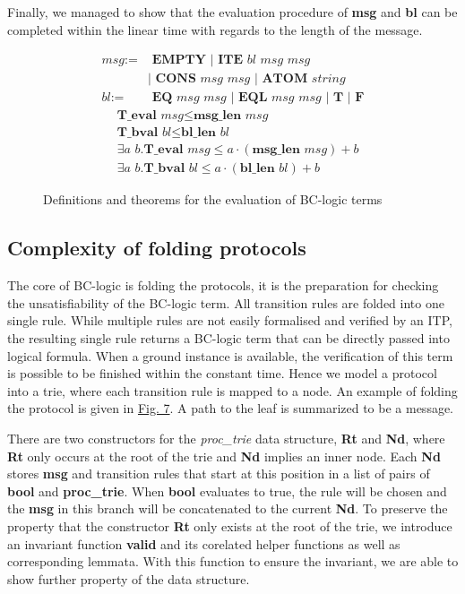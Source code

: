 \documentclass[conference]{IEEEtran}
\begin{document}
Finally, we managed to show that the evaluation procedure of \textbf{msg} and \textbf{bl} can be completed within the linear time with regards to the length of the message.
\begin{figure}
\centering
\begin{align}
    \textit{msg} :=& \textbf{ EMPTY } | \textbf{ ITE } \textit{bl msg msg } \nonumber \\ 
    &| \textbf{ CONS } \textit{msg msg } | \textbf{ ATOM } \textit{string} \nonumber\\
    \textit{bl} :=& \textbf{ EQ } \textit{msg msg } | \textbf{ EQL } \textit{msg msg } | \textbf{ T } | \textbf{ F} \nonumber
 \end{align}
 \begin{align}
    &\textbf{T\_eval } \textit{msg} \leq \textbf{msg\_len } \textit{msg} \nonumber\\
    &\textbf{T\_bval } \textit{bl} \leq \textbf{bl\_len } \textit{bl} \nonumber\\
    & \exists \textit{a b}. \textbf{T\_eval } \textit{msg} \leq a \cdot (\textbf{msg\_len} \textit{ msg}) + b\nonumber\\
    & \exists \textit{a b}. \textbf{T\_bval } \textit{bl} \leq a \cdot (\textbf{bl\_len} \textit{ bl}) + b\nonumber
\end{align}
\caption{Definitions and theorems for the evaluation of BC-logic terms}
\label{bcterms}
\end{figure}
\subsection{Complexity of folding protocols}
The core of BC-logic is folding the protocols, it is the preparation for checking the unsatisfiability of the BC-logic term. All transition rules are folded into one single rule. While multiple rules are not easily formalised and verified by an ITP, the resulting single rule returns a BC-logic term that can be directly passed into logical formula. When a ground instance is available, the verification of this term is possible to be finished within the constant time. Hence we model a protocol into a trie\cite{trie}, where each transition rule is mapped to a node. An example of folding the protocol is given in \hyperref[figure:7]{Fig. 7}. A path to the leaf is summarized to be a message. 

There are two constructors for the \textit{proc\_trie} data structure, \textbf{Rt} and \textbf{Nd}, where \textbf{Rt} only occurs at the root of the trie and \textbf{Nd} implies an inner node. Each \textbf{Nd} stores \textbf{msg} and transition rules that start at this position in a list of pairs of \textbf{bool} and \textbf{proc\_trie}. When \textbf{bool} evaluates to true, the rule will be chosen and the \textbf{msg} in this branch will be concatenated to the current \textbf{Nd}. To preserve the property that the constructor \textbf{Rt} only exists at the root of the trie, we introduce an invariant function \textbf{valid} and its corelated helper functions as well as corresponding lemmata. With this function to ensure the invariant, we are able to show further property of the data structure.
\end{document}

